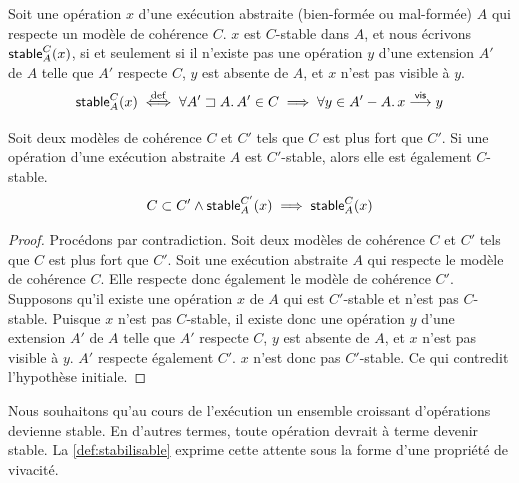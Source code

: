 \begin{definition}\label{def:stable}
Soit une opération $x$ d'une exécution abstraite (bien-formée ou mal-formée) $A$ qui respecte un modèle de cohérence $C$.
$x$ est $C$-stable dans $A$, et nous écrivons $\operatorname{\mathsf{stable}}_A^C(x)$, si et seulement si il n'existe pas une opération $y$ d'une extension $A'$ de $A$ telle que $A'$ respecte $C$, $y$ est absente de $A$, et $x$ n'est pas visible à $y$.
\begin{equation*}
  \operatorname{\mathsf{stable}}_A^C(x) \overset{\mathrm{def}}{\iff} \forall A' \sqsupset A \ldotp A' \in C \implies \forall y \in A' - A \ldotp x \overset{\mathsf{vis}}{\longrightarrow} y
\end{equation*}
\end{definition}


\begin{theorem}\label{th:stability-hierarchy}
Soit deux modèles de cohérence $C$ et $C'$ tels que $C$ est plus fort que $C'$.
Si une opération d'une exécution abstraite $A$ est $C'$-stable, alors elle est également $C$-stable.
\begin{equation*}
    C \subset C' \land \operatorname{\mathsf{stable}}_A^{C'}(x) \implies \operatorname{\mathsf{stable}}_A^{C}(x)
\end{equation*}
\end{theorem}

\begin{proof}
Procédons par contradiction.
Soit deux modèles de cohérence $C$ et $C'$ tels que $C$ est plus fort que $C'$.
Soit une exécution abstraite $A$ qui respecte le modèle de cohérence $C$.
Elle respecte donc également le modèle de cohérence $C'$.
Supposons qu'il existe une opération $x$ de $A$ qui est $C'$-stable et n'est pas $C$-stable.
Puisque $x$ n'est pas $C$-stable, il existe donc une opération $y$ d'une extension $A'$ de $A$ telle que $A'$ respecte $C$, $y$ est absente de $A$, et $x$ n'est pas visible à $y$.
$A'$ respecte également $C'$.
$x$ n'est donc pas $C'$-stable.
Ce qui contredit l'hypothèse initiale.
\end{proof}

Nous souhaitons qu'au cours de l'exécution un ensemble croissant d'opérations devienne stable.
En d'autres termes, toute opération devrait à terme devenir stable.
La \autoref{def:stabilisable} exprime cette attente sous la forme d'une propriété de vivacité.

